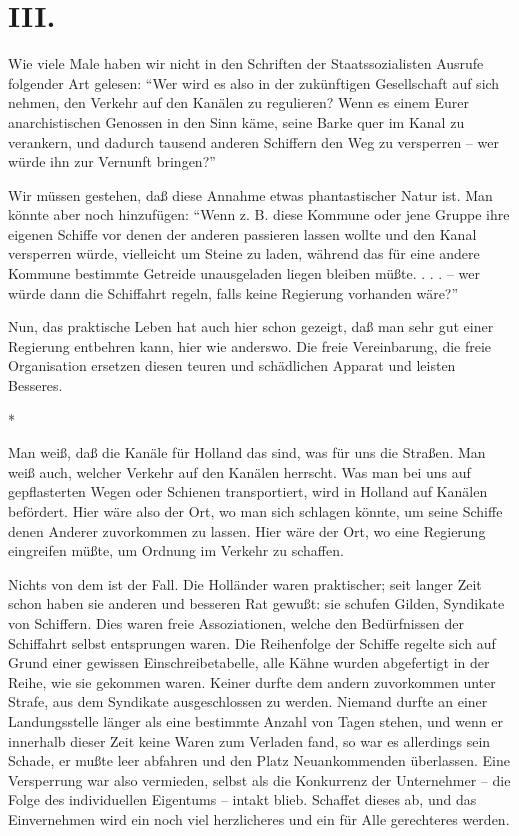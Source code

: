 \documentclass{scrbook}
\begin{document}
\section*{III.}

Wie viele Male haben wir nicht in den Schriften der Staatssozialisten Ausrufe folgender Art gelesen: ``Wer wird es also in der zukünftigen Gesellschaft auf sich nehmen, den Verkehr auf den Kanälen zu regulieren? Wenn es einem Eurer anarchistischen Genossen in den Sinn käme, seine Barke quer im Kanal zu verankern, und dadurch tausend anderen Schiffern den Weg zu versperren – wer würde ihn zur Vernunft bringen?''

Wir müssen gestehen, daß diese Annahme etwas phantastischer Natur ist. Man könnte aber noch hinzufügen: ``Wenn z. B. diese Kommune oder jene Gruppe ihre eigenen Schiffe vor denen der anderen passieren lassen wollte und den Kanal versperren würde, vielleicht um Steine zu laden, während das für eine andere Kommune bestimmte Getreide unausgeladen liegen bleiben müßte. . . . – wer würde dann die Schiffahrt regeln, falls keine Regierung vorhanden wäre?''

Nun, das praktische Leben hat auch hier schon gezeigt, daß man sehr gut einer Regierung entbehren kann, hier wie anderswo. Die freie Vereinbarung, die freie Organisation ersetzen diesen teuren und schädlichen Apparat und leisten Besseres.

\begin{center}*\end{center}

Man weiß, daß die Kanäle für Holland das sind, was für uns die Straßen. Man weiß auch, welcher Verkehr auf den Kanälen herrscht. Was man bei uns auf gepflasterten Wegen oder Schienen transportiert, wird in Holland auf Kanälen befördert. Hier wäre also der Ort, wo man sich schlagen könnte, um seine Schiffe denen Anderer zuvorkommen zu lassen. Hier wäre der Ort, wo eine Regierung eingreifen müßte, um Ordnung im Verkehr zu schaffen.

Nichts von dem ist der Fall. Die Holländer waren praktischer; seit langer Zeit schon haben sie anderen und besseren Rat gewußt: sie schufen Gilden, Syndikate von Schiffern. Dies waren freie Assoziationen, welche den Bedürfnissen der Schiffahrt selbst entsprungen waren. Die Reihenfolge der Schiffe regelte sich auf Grund einer gewissen Einschreibetabelle, alle Kähne wurden abgefertigt in der Reihe, wie sie gekommen waren. Keiner durfte dem andern zuvorkommen unter Strafe, aus dem Syndikate ausgeschlossen zu werden. Niemand durfte an einer Landungsstelle länger als eine bestimmte Anzahl von Tagen stehen, und wenn er innerhalb dieser Zeit keine Waren zum Verladen fand, so war es allerdings sein Schade, er mußte leer abfahren und den Platz Neuankommenden überlassen. Eine Versperrung war also vermieden, selbst als die Konkurrenz der Unternehmer – die Folge des individuellen Eigentums – intakt blieb. Schaffet dieses ab, und das Einvernehmen wird ein noch viel herzlicheres und ein für Alle gerechteres werden.
\end{document}
